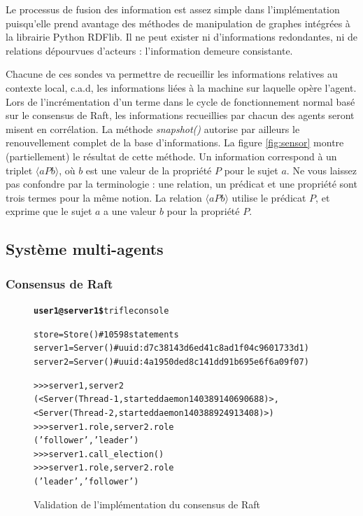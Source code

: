 Le processus de fusion des information est assez simple dans l'implémentation
puisqu'elle prend avantage des méthodes de manipulation de graphes intégrées à
la librairie Python RDFlib. Il ne peut exister ni d'informations redondantes, ni
de relations dépourvues d'acteurs : l'information demeure consistante.

Chacune de ces sondes va permettre de recueillir les informations relatives au
contexte local, c.a.d, les informations liées à la machine sur laquelle opère
l'agent. Lors de l'incrémentation d'un terme dans le cycle de fonctionnement
normal basé sur le consensus de Raft, les informations recueillies par chacun
des agents seront misent en corrélation. La méthode \emph{snapshot()} autorise
par ailleurs le renouvellement complet de la base d'informations.  La figure
\ref{fig:sensor} montre (partiellement) le résultat de cette méthode.  Un
information correspond à un triplet $\langle a P b \rangle$, où $b$ est une
valeur de la propriété $P$ pour le sujet $a$. Ne vous laissez pas confondre par
la terminologie : une relation, un prédicat et une propriété sont trois termes
pour la même notion. La relation $\langle a P b \rangle$ utilise le prédicat
$P$, et exprime que le sujet $a$ a une valeur $b$ pour la propriété $P$.

\begin{figure}[H]
\end{figure}

\subsection{Système multi-agents}

\subsubsection{Consensus de Raft}

\begin{figure}
  \begin{alltt}\scriptsize
    \textbf{user1@server1\$} trifle console

    store   = Store()  # 10598 statements
    server1 = Server() # uuid: d7c38143d6ed41c8ad1f04c9601733d1)
    server2 = Server() # uuid: 4a1950ded8c141dd91b695e6f6a09f07)
    
    >>> server1, server2
    (<Server(Thread-1, started daemon 140389140690688)>, 
     <Server(Thread-2, started daemon 140388924913408)>)
    >>> server1.role, server2.role
    ('follower', 'leader')
    >>> server1.call_election()
    >>> server1.role, server2.role
    ('leader', 'follower')
  \end{alltt}
  \caption{Validation de l'implémentation du consensus de Raft}
  \label{fig:raft}
\end{figure}

